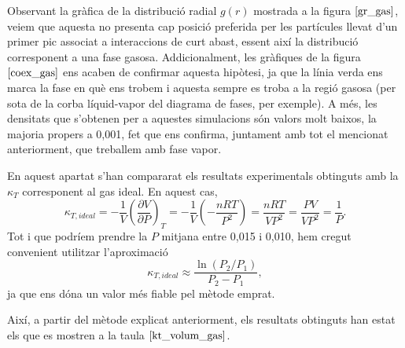 \documentclass[a4paper,10.5pt]{report}
\begin{document}
Observant la gràfica de la distribució radial $g(r)$ mostrada a la figura $\ref{gr_gas}$, veiem que aquesta no presenta cap posició preferida per les partícules llevat d'un primer pic associat a interaccions de curt abast, essent així la distribució corresponent a una fase gasosa. Addicionalment, les gràfiques de la figura $\ref{coex_gas}$ ens acaben de confirmar aquesta hipòtesi, ja que la línia verda ens marca la fase en què ens trobem i aquesta sempre es troba a la regió gasosa (per sota de la corba líquid-vapor del diagrama de fases, per exemple). A més, les densitats que s'obtenen per a aquestes simulacions són valors molt baixos, la majoria propers a 0,001, fet que ens confirma, juntament amb tot el mencionat anteriorment, que treballem amb fase vapor.

En aquest apartat s'han compararat els resultats experimentals obtinguts amb la $\kappa_T$ corresponent al gas ideal. En aquest cas,
\begin{equation}
	\kappa_{T,ideal}=-\frac{1}{V} \left(\frac{\partial V}{\partial P}\right)_T = -\frac{1}{V} \left(-\frac{nRT}{P^2}\right) = \frac{nRT}{V P^2} = \frac{PV}{V P^2} = \frac{1}{P}.
\end{equation}
Tot i que podríem prendre la $P$ mitjana entre 0,015 i 0,010, hem cregut convenient utilitzar l'aproximació
\begin{equation}
	\kappa_{T,ideal}\approx\frac{\ln(P_2/P_1)}{P_2-P_1},
\label{ktideal}
\end{equation}
ja que ens dóna un valor més fiable pel mètode emprat.

Així, a partir del mètode explicat anteriorment, els resultats obtinguts han estat els que es mostren a la taula $\ref{kt_volum_gas}$.
\end{document}
